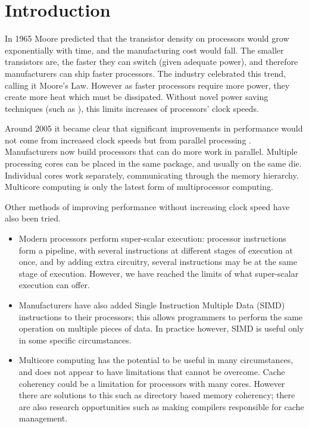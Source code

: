 %
%
\chapter{Introduction}
\label{chap:intro}


In 1965 Moore \citep{moore} predicted that the transistor 
density on processors would grow exponentially with time,
and the manufacturing cost would fall.
The smaller transistors are, the faster they can switch
(given adequate power),
and therefore manufacturers can ship faster processors.
The industry celebrated this trend,
calling it Moore's Law.
However as faster processors require more power,
they create more heat which must be dissipated.
Without novel power saving techniques
(such as \citet{intel-high-k}),
this limits increases of processors' clock speeds.

Around 2005 it became clear that significant improvements in performance
would not come from increased clock speeds but from parallel processing
\citep{free_lunch}.
Manufacturers now build processors that can do more work in parallel.
Multiple processing cores can be placed in the same package,
and usually on the same die.
Individual cores work separately, communicating through the memory
hierarchy.
Multicore computing is only the latest form of multiprocessor computing.

Other methods of improving performance without increasing clock speed have
also been tried.

\begin{itemize}

\item
Modern processors perform super-scalar execution:
processor instructions form a pipeline,
with several instructions at different stages of execution at once,
and by adding extra circuitry, several instructions may be at the same stage
of execution.
However, we have reached the limits of what super-scalar execution can
offer.

\item
Manufacturers have also added Single Instruction Multiple Data (SIMD)
instructions to their processors;
this allows programmers to perform the same operation on multiple pieces of
data.
In practice however, SIMD is useful only in some specific circumstances.

\item
Multicore computing has the potential to be useful in many circumstances,
and does not appear to have limitations that cannot be overcome.
Cache coherency could be a limitation for processors with many cores.
However there are solutions to this such as directory based memory
coherency;
there are also research opportunities such as making compilers responsible
for cache management.

\end{itemize}

